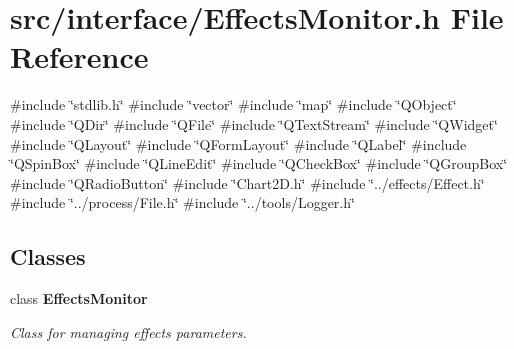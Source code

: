\section{src/interface/\+Effects\+Monitor.h File Reference}
\label{_effects_monitor_8h}
{\ttfamily \#include \char`\"{}stdlib.\+h\char`\"{}}\newline
{\ttfamily \#include \char`\"{}vector\char`\"{}}\newline
{\ttfamily \#include \char`\"{}map\char`\"{}}\newline
{\ttfamily \#include \char`\"{}Q\+Object\char`\"{}}\newline
{\ttfamily \#include \char`\"{}Q\+Dir\char`\"{}}\newline
{\ttfamily \#include \char`\"{}Q\+File\char`\"{}}\newline
{\ttfamily \#include \char`\"{}Q\+Text\+Stream\char`\"{}}\newline
{\ttfamily \#include \char`\"{}Q\+Widget\char`\"{}}\newline
{\ttfamily \#include \char`\"{}Q\+Layout\char`\"{}}\newline
{\ttfamily \#include \char`\"{}Q\+Form\+Layout\char`\"{}}\newline
{\ttfamily \#include \char`\"{}Q\+Label\char`\"{}}\newline
{\ttfamily \#include \char`\"{}Q\+Spin\+Box\char`\"{}}\newline
{\ttfamily \#include \char`\"{}Q\+Line\+Edit\char`\"{}}\newline
{\ttfamily \#include \char`\"{}Q\+Check\+Box\char`\"{}}\newline
{\ttfamily \#include \char`\"{}Q\+Group\+Box\char`\"{}}\newline
{\ttfamily \#include \char`\"{}Q\+Radio\+Button\char`\"{}}\newline
{\ttfamily \#include \char`\"{}Chart2\+D.\+h\char`\"{}}\newline
{\ttfamily \#include \char`\"{}../effects/\+Effect.\+h\char`\"{}}\newline
{\ttfamily \#include \char`\"{}../process/\+File.\+h\char`\"{}}\newline
{\ttfamily \#include \char`\"{}../tools/\+Logger.\+h\char`\"{}}\newline
\subsection*{Classes}
\begin{DoxyCompactItemize}
\item 
class \textbf{ Effects\+Monitor}
\begin{DoxyCompactList}\small\item\em Class for managing effects parameters. \end{DoxyCompactList}\end{DoxyCompactItemize}
